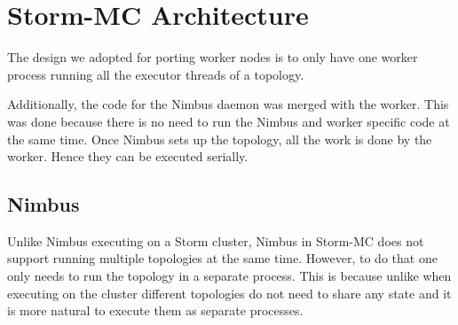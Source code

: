 
\section{Storm-MC Architecture}


The design we adopted for porting worker nodes is to only have one worker process running all the executor threads of a topology.

Additionally, the code for the Nimbus daemon was merged with the worker. This was done because there is no need to run the Nimbus and worker specific code at the same time. Once Nimbus sets up the topology, all the work is done by the worker. Hence they can be executed serially.

\subsection{Nimbus}

Unlike Nimbus executing on a Storm cluster, Nimbus in Storm-MC does not support running multiple topologies at the same time. However, to do that one only needs to run the topology in a separate process. This is because unlike when executing on the cluster different topologies do not need to share any state and it is more natural to execute them as separate processes.

